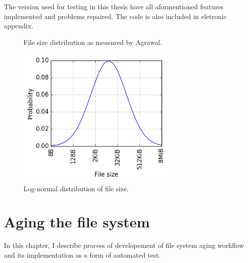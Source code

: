 \documentclass[
  color, %
  table, %
  lof,   %
  lot,   %
]{fithesis3}
\begin{document}
The version used for testing in this thesis have all aformentioned features implemented and problems repaired. The code is also included in eletronic appendix.

\begin{figure}
    \centering
    \caption{File size distribution as measured by Agrawal.~\cite{agrawal2007five}}
    \label{fig:filedist}
\end{figure}

\begin{figure}%
    \begin{minipage}{\textwidth}
        \centering
        \includegraphics[width=0.7\textwidth]{../scripts/dist3.png}
        \caption{Log-normal distribution of file size.}
\label{fig:lognormal}
    \end{minipage}
\end{figure}



\chapter{Aging the file system}
\label{aging}
In this chapter, I describe process of developement of file system aging workflow and its implementation as a form of automated test.
\end{document}
